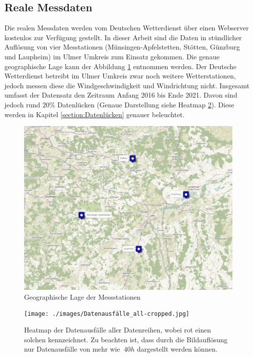 \documentclass[
12pt, %
toc=listofnumbered, %
toc=chapterentrydotfill, %
numbers=noenddot, %
captions=tableheading, %
bibliography=numbered
]{scrreprt}
\let\Oldsubsection\subsection
\renewcommand{\subsection}{\FloatBarrier\Oldsubsection}
\begin{document}
\subsection{Reale Messdaten}\label{section:realeMessdaten}
Die realen Messdaten werden vom Deutschen Wetterdienst über einen Webserver kostenlos zur Verfügung gestellt. In dieser Arbeit sind die Daten in stündlicher Auflösung von vier Messtationen (Münsingen-Apfelstetten, Stötten, Günzburg und Laupheim) im Ulmer Umkreis zum Einsatz gekommen. Die genaue geographische Lage kann der Abbildung \ref{fig:map} entnommen werden. Der Deutsche Wetterdienst betreibt im Ulmer Umkreis zwar noch weitere Wetterstationen, jedoch messen diese die Windgeschwindigkeit und Windrichtung nicht. Insgesamt umfasst der Datensatz den Zeitraum Anfang 2016 bis Ende 2021. Davon sind jedoch rund $20\%$ Datenlücken (Genaue Darstellung siehe Heatmap \ref{fig:heatmap}). Diese werden in Kapitel \ref{section:Datenlücken} genauer beleuchtet. 

\begin{figure}[tph]
	\begin{center}
		\includegraphics[width=\textwidth]{./images/map.png}
		\caption{Geographische Lage der Messstationen \cite{2021_OpenStreetMap-Contributors_UMap}}
		\label{fig:map}
	\end{center}
\end{figure}

\begin{figure}[tph]
	\begin{center}
		\texttt{[image: ./images/Datenausfälle\_all-cropped.jpg]}
		\caption{Heatmap der Datenausfälle aller Datenreihen, wobei rot einen solchen kennzeichnet. Zu beachten ist, dass durch die Bildauflösung nur Datenausfälle von mehr wie $~40h$ dargestellt werden können.}
		\label{fig:heatmap}
	\end{center}
\end{figure}
\end{document}
